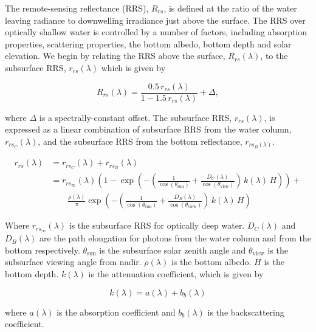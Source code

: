 \documentclass[12pt]{article}
\numberwithin{equation}{section}
\begin{document}
The remote-sensing reflectance (RRS), $R_{rs}$, is defined at the ratio of the 
water leaving radiance to downwelling irradiance just above the surface. 
The RRS over optically shallow 
water is controlled by a number of factors, including absorption properties, scattering 
properties, the bottom albedo, bottom depth and solar elevation. We begin by relating the RRS 
above the surface, $R_{rs}(\lambda)$, to the subsurface RRS, $r_{rs}(\lambda)$ which is given by
\begin{linenomath}
\begin{equation*}
R_{rs}(\lambda) = \frac{0.5\,r_{rs}(\lambda)}{1 - 1.5\,r_{rs}(\lambda)} + \Delta,
\end{equation*} 
\end{linenomath}
where $\Delta$ is a spectrally-constant offset. The subsurface RRS, $r_{rs}(\lambda)$, is 
expressed as a linear combination of subsurface RRS from the water column, $r_{rs_C}(\lambda)$, 
and the subsurface RRS from the bottom reflectance, $r_{rs_B(\lambda)}$. 
\begin{linenomath}
\begin{align}
r_{rs}(\lambda) &= r_{rs_C}(\lambda) + r_{rs_B}(\lambda)\nonumber \\
&= r_{rs_{\infty}}(\lambda) \left(1 - \exp\left(-\left(\frac{1}{\cos(\theta_{\text{sun}})} + \frac{D_C(\lambda)}{\cos(\theta_{\text{view}})}\right)\,k(\lambda)\,H\right)\right) + \nonumber\\
& \qquad \frac{\rho(\lambda)}{\pi}\exp\left(-\left(\frac{1}{\cos(\theta_{\text{sun}})} + \frac{D_B(\lambda)}{\cos(\theta_{\text{view}})}\right)\,k(\lambda)\,H\right) \label{rrs_model}
\end{align}
\end{linenomath}
Where $r_{rs_{\infty}}(\lambda)$ is the subsurface RRS for optically deep water. $D_C(\lambda)$ and $D_B(\lambda)$ 
are the path elongation for photons from the water column and from the bottom respectively. 
$\theta_{\text{sun}}$ is the subsurface solar zenith angle and $\theta_{\text{view}}$ is 
the subsurface viewing angle from nadir. $\rho(\lambda)$ is the bottom albedo. $H$ is the bottom 
depth. $k(\lambda)$ is the attenuation coefficient, which is given by
\begin{linenomath}
\begin{equation}
k(\lambda) = a(\lambda) + b_b(\lambda)\label{k_eqn}
\end{equation}
\end{linenomath}
where $a(\lambda)$ is the absorption coefficient and $b_b(\lambda)$ is the backscattering 
coefficient. \\
\end{document}
